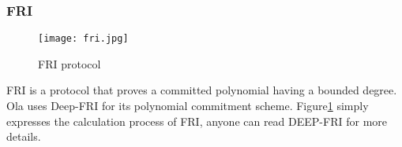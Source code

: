 \subsubsection{FRI}\label{section: starky-fri}

\begin{figure}[!htp]
    \centering
    \texttt{[image: fri.jpg]}
    \caption{FRI protocol}
    \label{fig: FRI}
\end{figure}

FRI is a protocol that proves a committed polynomial having a bounded degree. Ola uses Deep-FRI for its polynomial commitment scheme. Figure\ref{fig: FRI} simply expresses the calculation process of FRI, anyone can read DEEP-FRI\cite{cryptoeprint:2019/336} for more details.